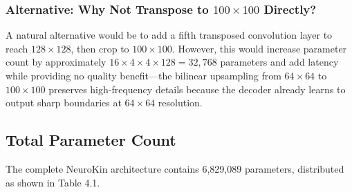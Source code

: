 \documentclass[12pt,a4paper,oneside]{report}
\begin{document}
\subsubsection{Alternative: Why Not Transpose to $100 \times 100$ Directly?}

A natural alternative would be to add a fifth transposed convolution layer to reach $128 \times 128$, then crop to $100 \times 100$. However, this would increase parameter count by approximately $16 \times 4 \times 4 \times 128 = 32,768$ parameters and add latency while providing no quality benefit---the bilinear upsampling from $64 \times 64$ to $100 \times 100$ preserves high-frequency details because the decoder already learns to output sharp boundaries at $64 \times 64$ resolution.

\subsection{Total Parameter Count}

The complete NeuroKin architecture contains 6,829,089 parameters, distributed as shown in Table 4.1.

\begin{table}[H]
\centering
\caption{NeuroKin parameter distribution by component.}
\label{tab:neurokin_params}
\end{table}
\end{document}
